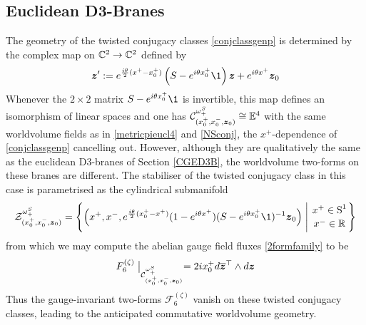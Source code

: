 \subsection{Euclidean D3-Branes}
\label{EuclD3Twist}
The geometry of the twisted conjugacy classes \eqref{conjclassgenp} is
determined by the complex map on ${\mathbb C}^2\to{\mathbb C}^2$ defined by
\begin{equation}
  \label{complexmapeucl}
  \mz':= e^{\frac{ i\theta}2 (x^+-x_0^+)} \left(S- e^{ i\theta x_0^+} \1
  \right)\mz+ e^{ i\theta x^+} \mz_0
\end{equation}
Whenever the $2\times2$ matrix $S- e^{ i\theta x_0^+} \1$ is invertible, this map
defines an isomorphism of linear spaces and one has
$\mathcal{C}^{\omega_+^S}_{(x_0^+,x^-_0,{{\boldsymbol {z} }}_0)}\cong{\mathbb E}^4$ with the same
worldvolume fields as in \eqref{metricpieucl4} and \eqref{NSconj}, the
$x^+$-dependence of \eqref{conjclassgenp} cancelling out. However, although
they are qualitatively the same as the euclidean D3-branes of Section
\ref{CGED3B}, the worldvolume two-forms on these branes are different. The
stabiliser of the twisted conjugacy class in this case is parametrised as the
cylindrical submanifold
\begin{equation}
  \label{stabE4twist}
  \mathcal{Z}^{\omega_+^S}_{(x_0^+,x^-_0,\mz_0)}=\Biggl\{
      \left(x^+,x^-, e^{\frac{ i\theta}2 (x_0^+-x^+)} 
      (1- e^{ i\theta x^+}) (S- e^{ i\theta x_0^+} 
      \1)^{  -1}\mz_0\right) \Biggm|
      \genfrac{}{}{0pt}{}{x^+\in\S^1}{x^-\in\R}
      \Biggr\}
\end{equation}
from which we may compute the abelian gauge field fluxes \eqref{2formfamily} to
be
\begin{equation}
  \label{E4F6twist}
  F^{(\zeta)}_6\bigm|_{\mathcal{C}^{\omega_+^S}_{(x_0^+,x^-_0,{{\boldsymbol {z} }}_0)}}=
  2 i x_0^+  d\overline{{{\boldsymbol {z} }}}{}^{ \top}\wedge d{{\boldsymbol {z} }}
\end{equation}
Thus the gauge-invariant two-forms $\mathcal{F}_6^{(\zeta)}$ vanish on these
twisted conjugacy classes, leading to the anticipated commutative worldvolume
geometry.

